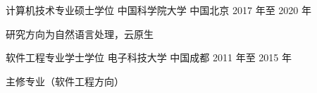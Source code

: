 

\begin{cventries}

  \cventry
    {计算机技术专业硕士学位} %
    {中国科学院大学} %
    {中国北京} %
    {2017 年至 2020 年} %
    {
      \begin{cvitems} %
        \item 研究方向为自然语言处理，云原生
      \end{cvitems}
    }

  \cventry
    {软件工程专业学士学位} %
    {电子科技大学} %
    {中国成都} %
    {2011 年至 2015 年} %
    {
      \begin{cvitems} %
        \item 主修专业（软件工程方向）
      \end{cvitems}
    }

\end{cventries}
